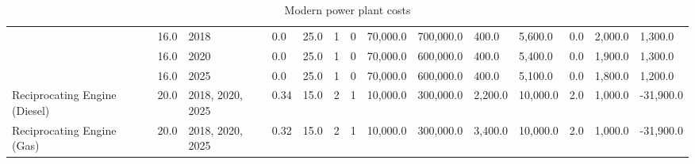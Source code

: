 \begin{table*}[]
\begin{tabularx}{\linewidth}{|p{}|l|l|l|l|l|l|l|l|l|l|l|l|l|}
& 16.0 & 2018 & 0.0 & 25.0 & 1 & 0 & 70,000.0 & 700,000.0 & 400.0 & 5,600.0 & 0.0 & 2,000.0 & 1,300.0 \\ \cline{2-14} 
& 16.0 & 2020 & 0.0 & 25.0 & 1 & 0 & 70,000.0 & 600,000.0 & 400.0 & 5,400.0 & 0.0 & 1,900.0 & 1,300.0 \\ \cline{2-14} 
& 16.0 & 2025 & 0.0 & 25.0 & 1 & 0 & 70,000.0 & 600,000.0 & 400.0 & 5,100.0 & 0.0 & 1,800.0 & 1,200.0 \\ \hline
Reciprocating Engine (Diesel) & 20.0 & 2018, 2020, 2025 & 0.34 & 15.0 & 2 & 1 & 10,000.0 & 300,000.0 & 2,200.0 & 10,000.0 & 2.0 & 1,000.0 & -31,900.0 \\ \hline
Reciprocating Engine (Gas) & 20.0 & 2018, 2020, 2025 & 0.32 & 15.0 & 2 & 1 & 10,000.0 & 300,000.0 & 3,400.0 & 10,000.0 & 2.0 & 1,000.0 & -31,900.0 \\ \hline

		\end{tabularx}
		\caption{Modern power plant costs \cite{Department2016}}
		\label{table:modern_plant_costs}
\end{table*}


